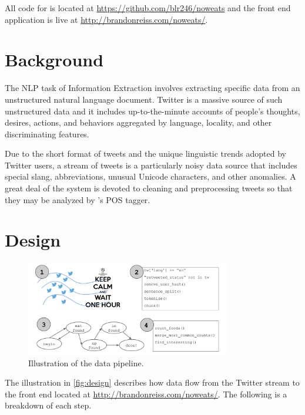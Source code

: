 \documentclass[letterpaper]{article}%
\begin{document}
All code for \noweats is located at \url{https://github.com/blr246/noweats} and
the front end application is live at \url{http://brandonreiss.com/noweats/}.

\section{Background}%
The NLP task of Information Extraction involves extracting specific data from
an unstructured natural language document. Twitter is a massive source of such
unstructured data and it includes up-to-the-minute accounts of people's
thoughts, desires, actions, and behaviors aggregated by language, locality, and
other discriminating features.

Due to the short format of tweets and the unique linguistic trends adopted by
Twitter users, a stream of tweets is a particularly noisy data source that
includes special slang, abbreviations, unusual Unicode characters, and other
anomalies. A great deal of the \noweats system is devoted to cleaning and
preprocessing tweets so that they may be analyzed by \nltk's POS tagger.

\section{Design}%

\begin{figure}[h]
  \centering
  \includegraphics[width=0.8\textwidth]{design}
  \caption{Illustration of the \noweats data pipeline.}
  \label{fig:design}
\end{figure}

The illustration in \autoref{fig:design} describes how data flow from the
Twitter stream to the \noweats front end located at
\url{http://brandonreiss.com/noweats/}. The following is a breakdown of each
step.
\end{document}
